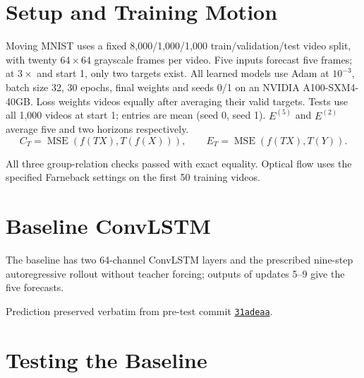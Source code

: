 
\section{Setup and Training Motion}
Moving MNIST uses a fixed 8,000/1,000/1,000 train/validation/test video split, with twenty $64\times64$ grayscale frames per video. Five inputs forecast five frames; at $3\times$ and start 1, only two targets exist. All learned models use Adam at $10^{-3}$, batch size 32, 30 epochs, final weights and seeds 0/1 on an NVIDIA A100-SXM4-40GB. Loss weights videos equally after averaging their valid targets. Tests use all 1,000 videos at start 1; entries are mean (seed 0, seed 1). $E^{(5)}$ and $E^{(2)}$ average five and two horizons respectively.
\[
C_T=\operatorname{MSE}\!\left(f(TX),T(f(X))\right),\qquad
E_T=\operatorname{MSE}\!\left(f(TX),T(Y)\right).
\]

All three group-relation checks passed with exact equality. Optical flow uses the specified Farneback settings on the first 50 training videos.
\clearpage
{}
\clearpage
\section{Baseline ConvLSTM}
The baseline has two 64-channel ConvLSTM layers and the prescribed nine-step autoregressive rollout without teacher forcing; outputs of updates 5--9 give the five forecasts.

\clearpage
{}
{\small\color{muted}Prediction preserved verbatim from pre-test commit \href{https://github.com/MuhammadBinTariq/DL4STG-PA2/commit/31adeaa74eaec058ac1a8b2f945f9e2c0c178ea8}{\texttt{31adeaa}}.}
\clearpage
\section{Testing the Baseline}

\clearpage

